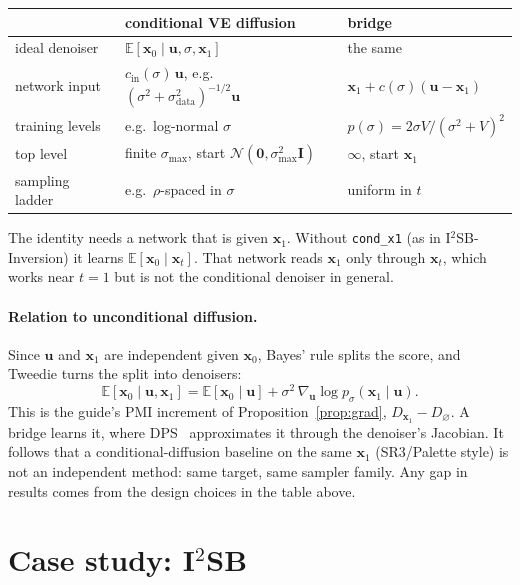 \documentclass[11pt]{article}
\theoremstyle{remark}
\newcommand{\x}{\bm{x}}
\newcommand{\uu}{\bm{u}}
\newcommand{\E}{\mathbb{E}}
\newcommand{\N}{\mathcal{N}}
\newcommand{\Id}{\bm{I}}
\newcommand{\grad}{\nabla}
\newcommand{\code}[1]{\texttt{#1}}
\newcommand{\Dz}{D_{\varnothing}}
\newcommand{\Dg}{D_{\x_1}}
\begin{document}
\begin{center}
\small
\begin{tabular}{@{}lll@{}}
\toprule
 & conditional VE diffusion & bridge \\
\midrule
ideal denoiser & $\E[\x_0\mid\uu,\sigma,\x_1]$ & the same \\
network input & $c_{\mathrm{in}}(\sigma)\,\uu$, e.g.\ $(\sigma^2+\sigma_{\mathrm{data}}^2)^{-1/2}\uu$
  & $\x_1 + c(\sigma)(\uu-\x_1)$ \\
training levels & e.g.\ log-normal $\sigma$ & $p(\sigma) = 2\sigma V/(\sigma^2+V)^2$ \\
top level & finite $\sigma_{\max}$, start $\N(\bm0,\sigma_{\max}^2\Id)$ & $\infty$, start $\x_1$ \\
sampling ladder & e.g.\ $\rho$-spaced in $\sigma$ & uniform in $t$ \\
\bottomrule
\end{tabular}
\end{center}

\noindent The identity needs a network that is given $\x_1$. Without \code{cond\_x1} (as in
I$^2$SB-Inversion) it learns $\E[\x_0\mid\x_t]$. That network reads $\x_1$ only through $\x_t$,
which works near $t=1$ but is not the conditional denoiser in general.

\paragraph{Relation to unconditional diffusion.} Since $\uu$ and $\x_1$ are independent given
$\x_0$, Bayes' rule splits the score, and Tweedie turns the split into denoisers:
\begin{equation}
  \E[\x_0\mid\uu,\x_1] = \E[\x_0\mid\uu] + \sigma^2\,\grad_{\uu}\log p_\sigma(\x_1\mid\uu).
  \label{eq:bayes}
\end{equation}
This is the guide's PMI increment of Proposition~\ref{prop:grad}, $\Dg-\Dz$. A bridge learns
it, where DPS~\cite{chung2023} approximates it through the denoiser's Jacobian. It follows that
a conditional-diffusion baseline on the same $\x_1$ (SR3/Palette style) is not an independent
method: same target, same sampler family. Any gap in results comes from the design choices in
the table above.

\section{Case study: I\texorpdfstring{$^2$}{2}SB}\label{sec:i2sb}
\end{document}
